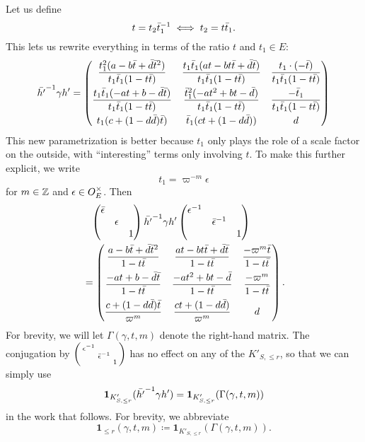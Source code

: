 Let us define
\[ t = t_2 \bar t_1 ^{-1} \iff t_2 = t \bar t_1. \]
This lets us rewrite everything in terms of the ratio $t$ and $t_1 \in E$:
\[
  \bar{h'} ^{-1} \gamma h'
  =
  \begin{pmatrix}
    \dfrac{t_1^2(a-b\bar t+\bar d \bar t^2)}{t_1 \bar t_1(1-t \bar t)}
    & \dfrac{t_1 \bar t_1(at-bt\bar t+\bar d \bar t)}{t_1 \bar t_1(1-t \bar t)}
    & \dfrac{t_1 \cdot (-\bar t)}{t_1 \bar t_1 (1-t \bar t)} \\[2ex]
    \dfrac{t_1\bar t_1(-at+b-\bar d \bar t)}{t_1 \bar t_1(1-t \bar t)}
    & \dfrac{\bar t_1^2(-at^2+bt-\bar d)}{t_1 \bar t_1(1-t \bar t)}
    & \dfrac{-\bar t_1}{t_1 \bar t_1(1-t \bar t)} \\[2ex]
    t_1(c + (1-d\bar d)\bar t) & \bar t_1(ct + (1-d \bar d)) & d
  \end{pmatrix}
\]
This new parametrization is better because $t_1$ only plays the role of
a scale factor on the outside, with ``interesting'' terms only involving $t$.
To make this further explicit, we write
\[ t_1 = \varpi^{-m} \epsilon \]
for $m \in \mathbb Z$ and $\epsilon \in O_E^\times$.
Then
\begin{align*}
  &\phantom=
  \begin{pmatrix} \bar\epsilon \\ & \epsilon \\ & & 1 \end{pmatrix}
  \bar{h'} \inv \gamma h'
  \begin{pmatrix} \epsilon\inv \\ & \bar\epsilon\inv \\ & & 1 \end{pmatrix} \\
  &=
  \begin{pmatrix}
  \dfrac{a-b\bar t+\bar d \bar t^2}{1-t \bar t}
  & \dfrac{at-bt\bar t+\bar d \bar t}{1-t \bar t}
  & \dfrac{-\varpi^m \bar t}{1-t \bar t} \\[2ex]
  \dfrac{-at+b-\bar d \bar t}{1-t \bar t}
  & \dfrac{-at^2+bt-\bar d}{1-t \bar t}
  & \dfrac{-\varpi^m}{1-t \bar t} \\[2ex]
  \dfrac{c + (1-d\bar d)\bar t}{\varpi^m} & \dfrac{ct + (1-d \bar d)}{\varpi^m} & d
  \end{pmatrix}.
\end{align*}
For brevity, we will let $\Gamma(\gamma, t, m)$ denote the right-hand matrix.
The conjugation by
$\left( \begin{smallmatrix} \epsilon^{-1} \\ & \bar\epsilon^{-1} \\ & & 1 \end{smallmatrix} \right)$
has no effect on any of the $K'_{S, \le r}$, so that we can simply use
\[ \mathbf{1}_{K'_{S, \le r}}(\bar{h'}^{-1} \gamma h') = \mathbf{1}_{K'_{S, \le r}}(\Gamma(\gamma, t, m)) \]
in the work that follows.
For brevity, we abbreviate
\[ \mathbf{1}_{\le r}(\gamma, t, m) \coloneqq \mathbf{1}_{K'_{S, \le r}}(\Gamma(\gamma, t, m)). \]

